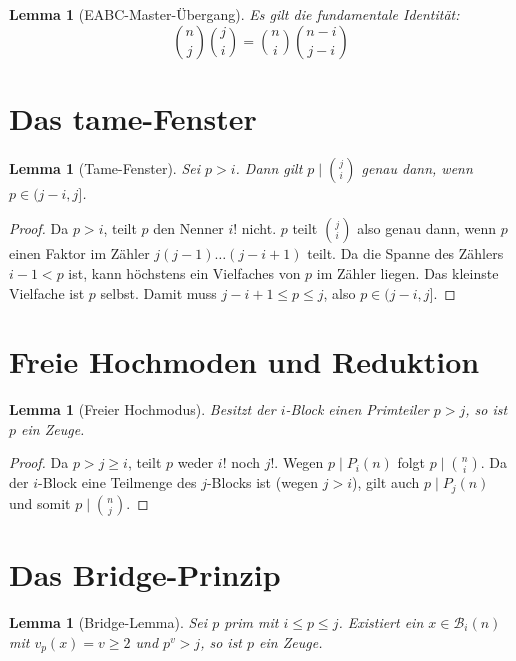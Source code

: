 \documentclass[12pt,a4paper]{article}
\theoremstyle{plain}
\newtheorem{lemma}[theorem]{Lemma}
\theoremstyle{definition}
\theoremstyle{remark}
\begin{document}
	\begin{lemma}[EABC-Master-Übergang]
		\label{lem:master}
		Es gilt die fundamentale Identität:
		\[ \binom{n}{j}\binom{j}{i} = \binom{n}{i}\binom{n-i}{j-i} \]
	\end{lemma}
	
	\section{Das tame-Fenster}
	
	\begin{lemma}[Tame-Fenster]
		\label{lem:tame-fenster}
		Sei $p > i$. Dann gilt $p \mid \binom{j}{i}$ genau dann, wenn $p \in (j-i, j]$.
	\end{lemma}
	
	\begin{proof}
		Da $p > i$, teilt $p$ den Nenner $i!$ nicht. $p$ teilt $\binom{j}{i}$ also genau dann, wenn $p$ einen Faktor im Zähler $j(j-1)\dots(j-i+1)$ teilt. Da die Spanne des Zählers $i-1 < p$ ist, kann höchstens ein Vielfaches von $p$ im Zähler liegen. Das kleinste Vielfache ist $p$ selbst. Damit muss $j-i+1 \le p \le j$, also $p \in (j-i, j]$.
	\end{proof}
	
	\section{Freie Hochmoden und Reduktion}
	
	\begin{lemma}[Freier Hochmodus]
		\label{lem:freier-hochmodus}
		Besitzt der $i$-Block einen Primteiler $p > j$, so ist $p$ ein Zeuge.
	\end{lemma}
	
	\begin{proof}
		Da $p > j \ge i$, teilt $p$ weder $i!$ noch $j!$. Wegen $p \mid P_i(n)$ folgt $p \mid \binom{n}{i}$. Da der $i$-Block eine Teilmenge des $j$-Blocks ist (wegen $j > i$), gilt auch $p \mid P_j(n)$ und somit $p \mid \binom{n}{j}$.
	\end{proof}
	
	\section{Das Bridge-Prinzip}
	
	\begin{lemma}[Bridge-Lemma]
		\label{lem:bridge}
		Sei $p$ prim mit $i \le p \le j$. Existiert ein $x \in \mathcal B_i(n)$ mit $v_p(x) = v \ge 2$ und $p^v > j$, so ist $p$ ein Zeuge.
	\end{lemma}
	
\end{document}
